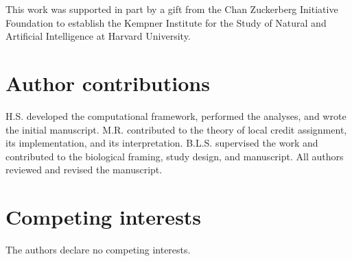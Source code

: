 \documentclass[11pt]{article}
\begin{document}
This work was supported in
part by a gift from the Chan Zuckerberg Initiative Foundation to establish the
Kempner Institute for the Study of Natural and Artificial Intelligence at
Harvard University.

\section*{Author contributions}

H.S. developed the computational framework, performed the analyses, and
wrote the initial manuscript. M.R. contributed to the theory of local credit
assignment, its implementation, and its interpretation. B.L.S. supervised the
work and contributed to the biological framing, study design, and manuscript.
All authors reviewed and revised the manuscript.

\section*{Competing interests}

The authors declare no competing interests.
\end{document}
